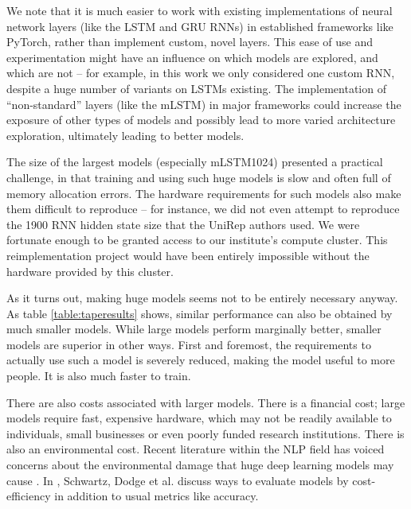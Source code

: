 \documentclass[a4paper,12pt]{article}
\begin{document}
We note that it is much easier to work with existing implementations of neural network layers (like the LSTM and GRU RNNs) in established frameworks like PyTorch, rather than implement custom, novel layers. This ease of use and experimentation might have an influence on which models are explored, and which are not -- for example, in this work we only considered one custom RNN, despite a huge number of variants on LSTMs existing. The implementation of ``non-standard'' layers (like the mLSTM) in major frameworks could increase the exposure of other types of models and possibly lead to more varied architecture exploration, ultimately leading to better models.

The size of the largest models (especially mLSTM1024) presented a practical challenge, in that training and using such huge models is slow and often full of memory allocation errors. The hardware requirements for such models also make them difficult to reproduce -- for instance, we did not even attempt to reproduce the 1900 RNN hidden state size that the UniRep authors used. We were fortunate enough to be granted access to our institute's compute cluster. This reimplementation project would have been entirely impossible without the hardware provided by this cluster.

As it turns out, making huge models seems not to be entirely necessary anyway. As table \ref{table:taperesults} shows, similar performance can also be obtained by much smaller models. While large models perform marginally better, smaller models are superior in other ways. First and foremost, the requirements to actually use such a model is severely reduced, making the model useful to more people. It is also much faster to train.

There are also costs associated with larger models. There is a financial cost; large models require fast, expensive hardware, which may not be readily available to individuals, small businesses or even poorly funded research institutions. There is also an environmental cost. Recent literature within the NLP field has voiced concerns about the environmental damage that huge deep learning models may cause \cite{strubell2019energy}. In \cite{greenai}, Schwartz, Dodge et al. discuss ways to evaluate models by cost-efficiency in addition to usual metrics like accuracy.
\end{document}
